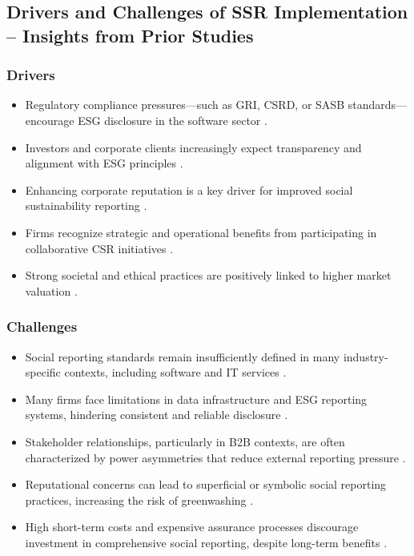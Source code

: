 \subsection{Drivers and Challenges of SSR Implementation – Insights from Prior Studies}
\subsubsection{Drivers}
\begin{itemize}
    \item Regulatory compliance pressures—such as GRI, CSRD, or SASB standards—encourage ESG disclosure in the software sector \parencite{Reitmaier2025, Bochkay2025}.
    \item Investors and corporate clients increasingly expect transparency and alignment with ESG principles \parencite{Bonnefon2022, Dai2019}.
    \item Enhancing corporate reputation is a key driver for improved social sustainability reporting \parencite{Reitmaier2025}.
    \item Firms recognize strategic and operational benefits from participating in collaborative CSR initiatives \parencite{Dai2019}.
    \item Strong societal and ethical practices are positively linked to higher market valuation \parencite{Chouaibi2021}.
\end{itemize}

\subsubsection{Challenges}
\begin{itemize}
    \item Social reporting standards remain insufficiently defined in many industry-specific contexts, including software and IT services \parencite{Bochkay2025}.
    \item Many firms face limitations in data infrastructure and ESG reporting systems, hindering consistent and reliable disclosure \parencite{Troshani2024, ElBaz2022, Jona2023, Belal2016}.
    \item Stakeholder relationships, particularly in B2B contexts, are often characterized by power asymmetries that reduce external reporting pressure \parencite{Dai2019}.
    \item Reputational concerns can lead to superficial or symbolic social reporting practices, increasing the risk of greenwashing \parencite{Reitmaier2025, Belal2016}.
    \item High short-term costs and expensive assurance processes discourage investment in comprehensive social reporting, despite long-term benefits \parencite{Dai2019, Najjar2023}.
\end{itemize}

